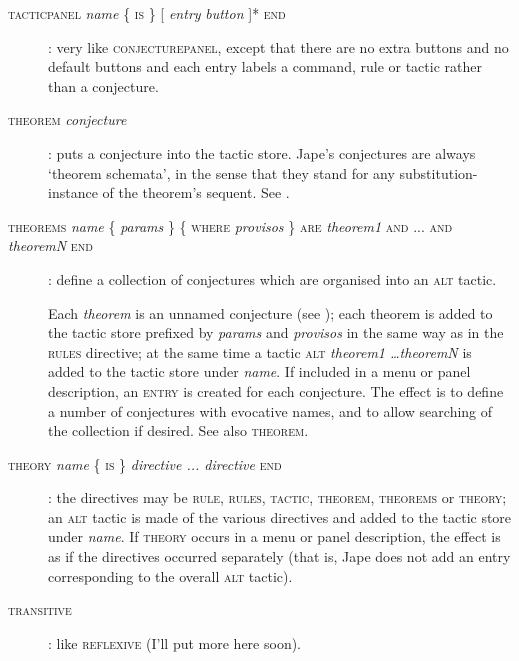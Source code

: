 \begin{description}
\item[\textsc{tacticpanel} \textit{name} \{ \textsc{is} \} \textsc{[} \textit{entry} {\textbar} \textit{button} \textsc{]}* \textsc{end}]: very like \textsc{conjecturepanel}, except that there are no extra buttons and no default buttons and each entry labels a command, rule or tactic rather than a conjecture. %

\item[\textsc{theorem} \textit{conjecture}]: puts a conjecture into the tactic store. Jape's conjectures are always `theorem schemata', in the sense that they stand for any substitution-instance of the theorem's sequent. See .

\item[\textsc{theorems} \textit{name} \{ \textit{params} \} \{ \textsc{where} \textit{provisos} \} \textsc{are} \textit{theorem1} \textsc{and} ... \textsc{and} \textit{theoremN} \textsc{end}]: define a collection of conjectures which are organised into an \textsc{alt} tactic.

Each \textit{theorem} is an unnamed conjecture (see ); each theorem is added to the tactic store prefixed by \textit{params} and \textit{provisos} in the same way as in the \textsc{rules} directive; at the same time a tactic \textsc{alt} \textit{theorem1 \dots theoremN} is added to the tactic store under \textit{name}. If included in a menu or panel description, an \textsc{entry} is created for each conjecture. The effect is to define a number of conjectures with evocative names, and to allow searching of the collection if desired. See also \textsc{theorem}.

\item[\textsc{theory} \textit{name} \{ \textsc{is} \} \textit{directive ... directive} \textsc{end}]: the directives may be \textsc{rule, rules, tactic, theorem, theorems} or \textsc{theory}; an \textsc{alt} tactic is made of the various directives and added to the tactic store under \textit{name}. If \textsc{theory} occurs in a menu or panel description, the effect is as if the directives occurred separately (that is, Jape does not add an entry corresponding to the overall \textsc{alt} tactic).

\item[\textsc{transitive}]: like \textsc{reflexive} (I'll put more here soon).


\end{description}
